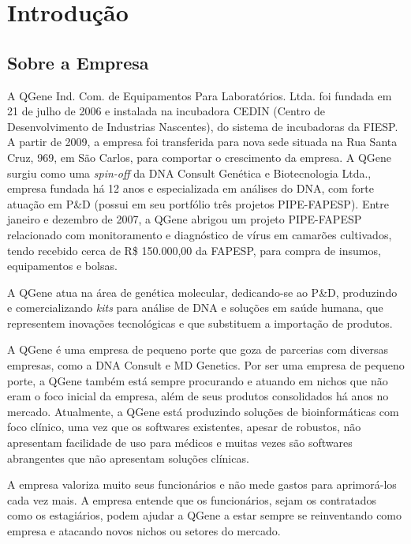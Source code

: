 \chapter{Introdução}
\label{chap:intro}

\section{Sobre a Empresa}
A QGene Ind. Com. de Equipamentos Para Laboratórios. Ltda. foi fundada em 21 de julho de 2006 e instalada 
na incubadora CEDIN (Centro de Desenvolvimento de Industrias Nascentes), do sistema de incubadoras da 
FIESP. A partir de 2009, a empresa foi transferida para nova sede situada na Rua Santa Cruz, 969, em São Carlos, 
para comportar o crescimento da empresa. A QGene surgiu como uma \textit{spin-off} da DNA Consult Genética e
Biotecnologia Ltda., empresa fundada há 12 anos e especializada em análises do DNA, com forte atuação em P\&D
(possui em seu portfólio três projetos PIPE-FAPESP). Entre janeiro e dezembro de 2007, a QGene abrigou um 
projeto PIPE-FAPESP relacionado com monitoramento e diagnóstico de vírus em camarões cultivados, tendo 
recebido cerca de R\$ 150.000,00 da FAPESP, para compra de insumos, equipamentos e bolsas.

A QGene atua na área de genética molecular, dedicando-se ao P\&D, produzindo e comercializando \textit{kits} para 
análise de DNA e soluções em saúde humana, que representem inovações tecnológicas e que substituem a 
importação de produtos.

A QGene é uma empresa de pequeno porte que goza de parcerias com diversas empresas, como a DNA Consult e MD Genetics.
Por ser uma empresa de pequeno porte, a QGene também está sempre procurando e atuando em nichos que não
eram o foco inicial da empresa, além de seus produtos consolidados há anos no mercado. Atualmente, a QGene
está produzindo soluções de bioinformáticas com foco clínico, uma vez que os softwares existentes, apesar
de robustos, não apresentam facilidade de uso para médicos e muitas vezes são softwares abrangentes
que não apresentam soluções clínicas.

A empresa valoriza muito seus funcionários e não mede gastos para aprimorá-los cada vez mais. A empresa entende
que os funcionários, sejam os contratados como os estagiários, podem ajudar a QGene a estar sempre se reinventando
como empresa e atacando novos nichos ou setores do mercado.

